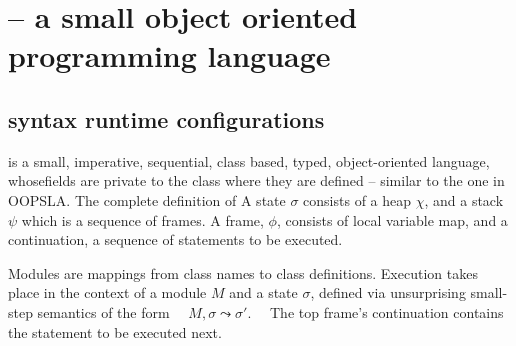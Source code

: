 \newcommand{\atom}{atom\xspace}
\newcommand{\atoms}{atoms\xspace}  
\newcommand{\pushSymbol}{\, {\triangledown}\, }  %
\newcommand{\popSymbol}{\, {\vartriangle}\, }  %
\newcommand{\Pushes}[3] {\ensuremath{ #1,   \overline{#2} \pushSymbol  #3}}
\newcommand{\Pop}[2] {\ensuremath{ #1 \popSymbol  #2}}
\newcommand{\va}{\ensuremath{\upsilon}}
\newcommand{\PushA}[4] {\ensuremath{   {\overline{#3}} \vdash #2 \pushSymbol  #4  }}
\newcommand{\PushALong}[4] {\ensuremath{     {#3} \vdash #2  \pushSymbol  #4  }}
\newcommand{\PopA}[2]{  #1   \popSymbol #2}
\newcommand{\PopAA}[3]{ \PopA {#2} {#3}}
\newcommand{\footnoteSD}[1]{} %


 
\section{\LangOO -- a small  object oriented programming language}

\subsection{\LangOO syntax runtime configurations}
\label{sub:Loo} 
 \LangOO  is a {small}, imperative, sequential,  class based, typed, object-oriented language, whosefields are private to the class where they are defined -- similar to the one in OOPSLA\footnoteSD{any differences?}.
The complete definition of 
A \LangOO state $\sigma$ consists of a  heap $\chi$, and a  {stack $\psi$ which is a sequence of frames}.
A frame, $\phi$, consists of local variable map, and a continuation, \ie a sequence of statements to be executed.
 
Modules are mappings from class names to class definitions. 
Execution takes place in the context of  a module $M$ and   a state $\sigma$, defined via unsurprising small-step semantics of the form \ \ 
   $M, \sigma \leadsto \sigma'$. \ \
The   top frame's continuation contains the statement to be  executed next.  

